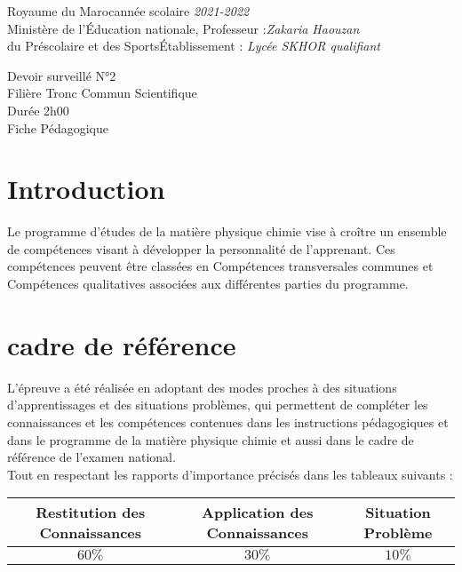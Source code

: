 \documentclass[12pt]{article}
\newcommand\headerMe[2]{\noindent{}#1\hfill#2}
\begin{document}
\headerMe{Royaume du Maroc}{année scolaire \emph{2021-2022}}\\
\headerMe{Ministère de l'Éducation nationale, }{  Professeur :\emph{Zakaria Haouzan}}\\
\headerMe{du Préscolaire et des Sports}{Établissement : \emph{Lycée SKHOR qualifiant}}\\

\begin{center}
Devoir surveillé N°2 \\
 Filière Tronc Commun Scientifique \\
Durée 2h00
\\
    \vspace{.2cm}
\hrulefill
\Large{Fiche Pédagogique}
\hrulefill\\
\end{center}


\section[A]{Introduction }
\hspace{0.5cm}Le programme d'études de la matière physique chimie vise à croître un ensemble de compétences visant à développer la personnalité de l'apprenant. Ces compétences peuvent être classées en Compétences transversales communes et Compétences qualitatives associées aux différentes parties du programme.
\section{cadre de référence }
 \hspace{0.5cm}L'épreuve a été réalisée en adoptant des modes proches à des situations d'apprentissages et des situations problèmes, qui permettent de compléter les connaissances et les compétences contenues dans les instructions pédagogiques et dans le programme de la matière physique chimie et aussi dans le cadre de référence de l'examen national. 
 \\Tout en respectant les rapports d'importance précisés dans les tableaux suivants :
 \begin{center}
\begin{tabular}{|c||c||c|}
\hline
    \textbf{Restitution des Connaissances} & \textbf{Application des Connaissances} & \textbf{Situation Problème }\\
    \hline
    $60\%$ & $30\%$ & $10\%$\\
    \hline
\end{tabular} 
\end{center}
\end{document}
